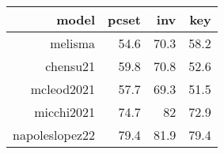\begin{tabular}{r|rrr}
model          & pcset & inv  & key  \\ \hline
melisma        & 54.6  & 70.3 & 58.2 \\
chensu21       & 59.8  & 70.8 & 52.6 \\
mcleod2021     & 57.7  & 69.3 & 51.5 \\
micchi2021     & 74.7  & 82   & 72.9 \\
napoleslopez22 & 79.4  & 81.9 & 79.4
\end{tabular}

